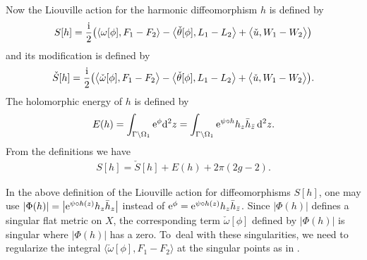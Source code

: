 \documentclass[10pt,a4paper]{amsart}
\numberwithin{equation}{section}
\begin{document}
Now the Liouville action for the harmonic diffeomorphism $h$ is defined by
\begin{gather*}%
S[h]=\frac{\rm i}{2}\bigl(\langle {\omega}[\phi], F_1-F_2 \rangle-\big\langle\check{\theta}[\phi], L_1-L_2 \big\rangle+\big\langle \check{u}, W_1-W_2 \big\rangle\bigr)
\end{gather*}
and its modification is defined by
\begin{gather*}
\check{S}[h]=\frac{\rm i}{2}\big(\big\langle \check{\omega}[\phi], F_1-F_2 \big\rangle-\big\langle\check{\theta}[\phi], L_1-L_2 \big\rangle+\big\langle \check{u}, W_1-W_2 \big\rangle\big).
\end{gather*}
The holomorphic energy of $h$ is defined by
\begin{gather*}%
E(h) = \int_{\Gamma\backslash \Omega_1} {\rm e}^{\phi} {\rm d}^2z = \int_{\Gamma\backslash\Omega_1} {\rm e}^{\psi\circ h} h_z \bar{h}_{\bar{z}}\, {\rm d}^2z.
\end{gather*}
From the definitions we have
\begin{gather*}
S[h]=\check{S}[h]+E(h)+ 2\pi (2g-2).
\end{gather*}

\begin{Remark}\label{r:def-with-Hopf}
In the above definition of the Liouville action for diffeomorphisms $S[h]$, one may use $|\Phi(h)|=\big|{\rm e}^{\psi\circ h(z)} h_z \bar{h}_z\big|$ instead of
${\rm e}^\phi={\rm e}^{\psi \circ h(z)} h_z \bar{h}_{\bar{z}}$. Since $|\Phi(h)|$ defines a singular flat metric on $X$, the corresponding term $\check{\omega}[\phi]$ defined by $|\Phi(h)|$
is singular where $|\Phi(h)|$ has a zero.
To~deal with these singularities, we need to regularize the integral $\langle \check{\omega}[\phi], F_1-F_2 \rangle$ at the singular points as in \cite{M-P}.
\end{Remark}
\end{document}
